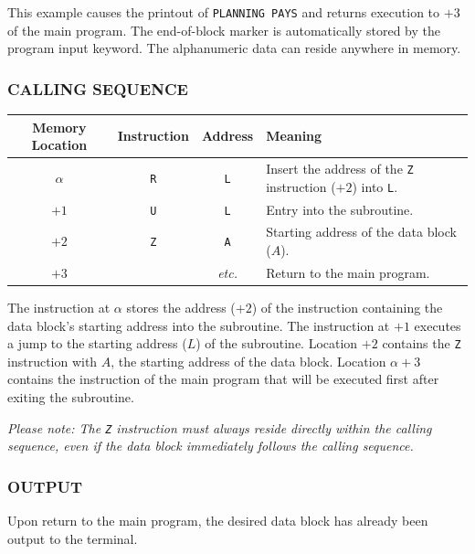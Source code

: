 This example causes the printout of \texttt{PLANNING PAYS} and returns execution to $+3$ of the main program. The end-of-block marker is automatically stored by the program input keyword. The alphanumeric data can reside anywhere in memory.

\subsubsection*{CALLING SEQUENCE}
\begin{table}[h!]
\centering
\begin{tabularx}{\textwidth}{cccX}
\toprule
\textbf{Memory Location} & \textbf{Instruction} & \textbf{Address} & \textbf{Meaning} \\
\midrule
$\alpha$ & \texttt{R} & \texttt{L} & Insert the address of the \texttt{Z} instruction ($+2$) into \texttt{L}. \\
$+1$ & \texttt{U} & \texttt{L} & Entry into the subroutine. \\
$+2$ & \texttt{Z} & \texttt{A} & Starting address of the data block ($A$). \\
$+3$ & & \textit{etc.} & Return to the main program. \\
\bottomrule
\end{tabularx}
\end{table}

The instruction at $\alpha$ stores the address ($+2$) of the instruction containing the data block's starting address into the subroutine. The instruction at $+1$ executes a jump to the starting address ($L$) of the subroutine. Location $+2$ contains the \texttt{Z} instruction with $A$, the starting address of the data block. Location $\alpha+3$ contains the instruction of the main program that will be executed first after exiting the subroutine. 

\textit{Please note: The \texttt{Z} instruction must always reside directly within the calling sequence, even if the data block immediately follows the calling sequence.}

\subsubsection*{OUTPUT}
Upon return to the main program, the desired data block has already been output to the terminal.

